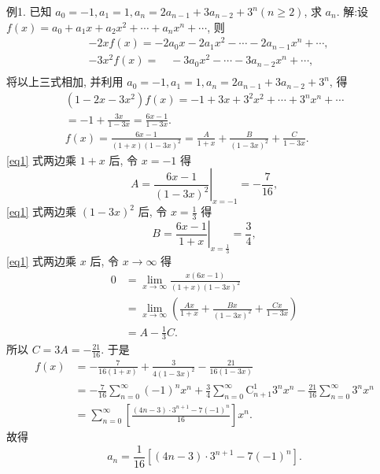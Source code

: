 例1. 已知 $a_0=-1, a_1=1, a_n=2 a_{n-1}+3 a_{n-2}+3^n(n \geqslant 2)$, 求 $a_n$.
解:设 $f(x)=a_0+a_1 x+a_2 x^2+\cdots+a_n x^n+\cdots$,
则
$$
\begin{aligned}
& -2 x f(x)=-2 a_0 x-2 a_1 x^2-\cdots-2 a_{n-1} x^n+\cdots, \\
& -3 x^2 f(x)=\quad-3 a_0 x^2-\cdots-3 a_{n-2} x^n+\cdots, \\
&
\end{aligned}
$$
将以上三式相加, 并利用 $a_0=-1, a_1=1, a_n=2 a_{n-1}+3 a_{n-2}+3^n$, 得
$$
\begin{gathered}
\left(1-2 x-3 x^2\right) f(x)=-1+3 x+3^2 x^2+\cdots+3^n x^n+\cdots \\
=-1+\frac{3 x}{1-3 x}=\frac{6 x-1}{1-3 x} . \\
f(x)=\frac{6 x-1}{(1+x)(1-3 x)^2}=\frac{A}{1+x}+\frac{B}{(1-3 x)^2}+\frac{C}{1-3 x} . \label{eq1}
\end{gathered}
$$
\ref{eq1} 式两边乘 $1+x$ 后, 令 $x=-1$ 得
$$
A=\left.\frac{6 x-1}{(1-3 x)^2}\right|_{x=-1}=-\frac{7}{16},
$$
\ref{eq1} 式两边乘 $(1-3 x)^2$ 后, 令 $x=\frac{1}{3}$ 得
$$
B=\left.\frac{6 x-1}{1+x}\right|_{x=\frac{1}{3}}=\frac{3}{4},
$$
\ref{eq1} 式两边乘 $x$ 后, 令 $x \rightarrow \infty$ 得
$$
\begin{aligned}
0 & =\lim _{x \rightarrow \infty} \frac{x(6 x-1)}{(1+x)(1-3 x)^2} \\
& =\lim _{x \rightarrow \infty}\left(\frac{A x}{1+x}+\frac{B x}{(1-3 x)^2}+\frac{C x}{1-3 x}\right) \\
& =A-\frac{1}{3} C .
\end{aligned}
$$
所以 $C=3 A=-\frac{21}{16}$. 于是
$$
\begin{aligned}
f(x) & =-\frac{7}{16(1+x)}+\frac{3}{4(1-3 x)^2}-\frac{21}{16(1-3 x)} \\
& =-\frac{7}{16} \sum_{n=0}^{\infty}(-1)^n x^n+\frac{3}{4} \sum_{n=0}^{\infty} \mathrm{C}_{n+1}^1 3^n x^n-\frac{21}{16} \sum_{n=0}^{\infty} 3^n x^n \\
& =\sum_{n=0}^{\infty}\left[\frac{(4 n-3) \cdot 3^{n+1}-7(-1)^n}{16}\right] x^n .
\end{aligned}
$$
故得
$$
a_n=\frac{1}{16}\left[(4 n-3) \cdot 3^{n+1}-7(-1)^n\right] .
$$



